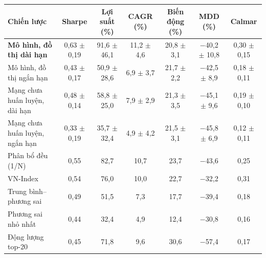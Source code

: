 \begin{tabular}{@{}lcccccc@{}}
\toprule
Chiến lược & Sharpe & Lợi suất (\%) & CAGR (\%) & Biến động (\%) & MDD (\%) & Calmar \\
\midrule
\textbf{Mô hình, đồ thị dài hạn} & 0{,}63 $\pm$ 0{,}19 & 91{,}6 $\pm$ 46{,}1 & 11{,}2 $\pm$ 4{,}6 & 20{,}8 $\pm$ 3{,}1 & $-$40{,}2 $\pm$ 10{,}8 & 0{,}30 $\pm$ 0{,}15 \\
Mô hình, đồ thị ngắn hạn & 0{,}43 $\pm$ 0{,}17 & 50{,}9 $\pm$ 28{,}6 & 6{,}9 $\pm$ 3{,}7 & 21{,}7 $\pm$ 2{,}2 & $-$42{,}5 $\pm$ 8{,}9 & 0{,}18 $\pm$ 0{,}11 \\
Mạng chưa huấn luyện, dài hạn & 0{,}48 $\pm$ 0{,}14 & 58{,}8 $\pm$ 25{,}0 & 7{,}9 $\pm$ 2{,}9 & 21{,}3 $\pm$ 3{,}5 & $-$45{,}1 $\pm$ 9{,}6 & 0{,}19 $\pm$ 0{,}10 \\
Mạng chưa huấn luyện, ngắn hạn & 0{,}33 $\pm$ 0{,}19 & 35{,}7 $\pm$ 32{,}4 & 4{,}9 $\pm$ 4{,}2 & 21{,}5 $\pm$ 3{,}1 & $-$45{,}8 $\pm$ 6{,}9 & 0{,}12 $\pm$ 0{,}11 \\
\midrule
Phân bổ đều (1/N) & 0{,}55 & 82{,}7 & 10{,}7 & 23{,}7 & $-$43{,}6 & 0{,}25 \\
VN-Index & 0{,}54 & 76{,}0 & 10{,}0 & 22{,}7 & $-$32{,}2 & 0{,}31 \\
Trung bình--phương sai & 0{,}49 & 51{,}5 & 7{,}3 & 17{,}7 & $-$39{,}4 & 0{,}18 \\
Phương sai nhỏ nhất & 0{,}44 & 32{,}4 & 4{,}9 & 12{,}4 & $-$30{,}8 & 0{,}16 \\
Động lượng top-20 & 0{,}45 & 71{,}8 & 9{,}6 & 30{,}6 & $-$57{,}4 & 0{,}17 \\
\bottomrule
\end{tabular}
